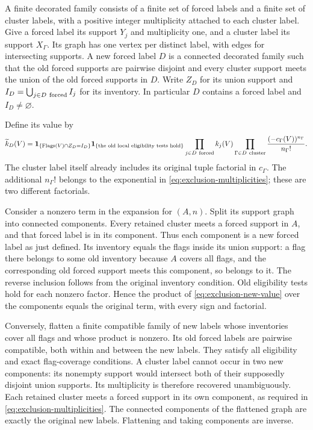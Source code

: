 A finite decorated family consists of a finite set of forced labels
and a finite set of cluster labels, with a positive integer multiplicity
attached to each cluster label. Give a forced label its support $Y_j$
and multiplicity one, and a cluster label its support $X_\Gamma$.
Its graph has one vertex per distinct label, with edges for intersecting
supports. A new forced label $D$ is a connected decorated family
such that the old forced supports are pairwise disjoint and every
cluster support meets the union of the old forced supports in $D$.
Write $Z_D$ for its union support and
$I_D=\bigcup_{j\in D\ {\rm forced}}I_j$ for its inventory. In
particular $D$ contains a forced label and $I_D\ne\varnothing$.

Define its value by
\begin{equation}\label{eq:exclusion-new-value}
 \widetilde k_D(V)=
  \mathbf1_{\{\operatorname{Flags}(V)\cap Z_D=I_D\}}
  \mathbf1_{\{\text{the old local eligibility tests hold}\}}
       \prod_{j\in D\ {\rm forced}}k_j(V)
       \prod_{\Gamma\in D\ {\rm cluster}}
                           \frac{(-c_\Gamma(V))^{n_\Gamma}}{n_\Gamma!}.
\end{equation}
The cluster label itself already includes its original tuple
factorial in $c_\Gamma$. The additional $n_\Gamma!$ belongs to the
exponential in \eqref{eq:exclusion-multiplicities}; these are two
different factorials.

Consider a nonzero term in the expansion for $(A,n)$. Split its
support graph into connected components. Every retained cluster
meets a forced support in $A$, and that forced label is in its
component. Thus each component is a new forced label as just
defined. Its inventory equals the flags inside its union support:
a flag there belongs to some old inventory because $A$ covers all
flags, and the corresponding old forced support meets this component,
so belongs to it. The reverse inclusion follows from the original
inventory condition. Old eligibility tests hold for each nonzero
factor. Hence the product of \eqref{eq:exclusion-new-value} over the
components equals the original term, with every sign and factorial.

Conversely, flatten a finite compatible family of new labels whose
inventories cover all flags and whose product is nonzero. Its old
forced labels are pairwise compatible, both within and between the
new labels. They satisfy all eligibility and exact flag-coverage
conditions. A cluster label cannot occur in two new components:
its nonempty support would intersect both of their supposedly
disjoint union supports. Its multiplicity is therefore recovered
unambiguously. Each retained cluster meets a forced support in its
own component, as required in \eqref{eq:exclusion-multiplicities}.
The connected components of the flattened graph are exactly the
original new labels. Flattening and taking components are inverse.

